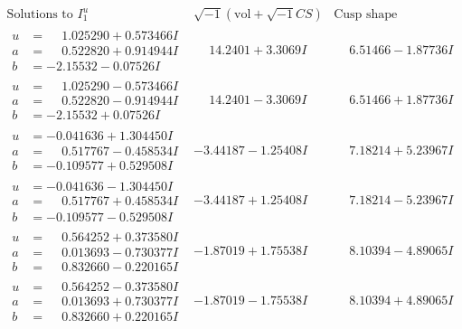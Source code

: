\documentclass[1p]{elsarticle_modified}
\theoremstyle{definition}
\newcommand{\I}{\sqrt{-1}}
\begin{document}
$$\begin{array}{c|c|c}  
\text{Solutions to }I^u_{1}& \I (\text{vol} + \sqrt{-1}CS) & \text{Cusp shape}\\
 \hline 
\begin{aligned}
u &= \phantom{-}1.025290 + 0.573466 I \\
a &= \phantom{-}0.522820 + 0.914944 I \\
b &= -2.15532 - 0.07526 I\end{aligned}
 & \phantom{-}14.2401 + 3.3069 I & \phantom{-}6.51466 - 1.87736 I \\ \hline\begin{aligned}
u &= \phantom{-}1.025290 - 0.573466 I \\
a &= \phantom{-}0.522820 - 0.914944 I \\
b &= -2.15532 + 0.07526 I\end{aligned}
 & \phantom{-}14.2401 - 3.3069 I & \phantom{-}6.51466 + 1.87736 I \\ \hline\begin{aligned}
u &= -0.041636 + 1.304450 I \\
a &= \phantom{-}0.517767 - 0.458534 I \\
b &= -0.109577 + 0.529508 I\end{aligned}
 & -3.44187 - 1.25408 I & \phantom{-}7.18214 + 5.23967 I \\ \hline\begin{aligned}
u &= -0.041636 - 1.304450 I \\
a &= \phantom{-}0.517767 + 0.458534 I \\
b &= -0.109577 - 0.529508 I\end{aligned}
 & -3.44187 + 1.25408 I & \phantom{-}7.18214 - 5.23967 I \\ \hline\begin{aligned}
u &= \phantom{-}0.564252 + 0.373580 I \\
a &= \phantom{-}0.013693 - 0.730377 I \\
b &= \phantom{-}0.832660 - 0.220165 I\end{aligned}
 & -1.87019 + 1.75538 I & \phantom{-}8.10394 - 4.89065 I \\ \hline\begin{aligned}
u &= \phantom{-}0.564252 - 0.373580 I \\
a &= \phantom{-}0.013693 + 0.730377 I \\
b &= \phantom{-}0.832660 + 0.220165 I\end{aligned}
 & -1.87019 - 1.75538 I & \phantom{-}8.10394 + 4.89065 I \\ \hline\begin{aligned}

\end{aligned}
\end{array}$$
\end{document}
